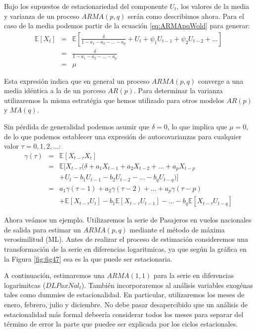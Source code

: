 \documentclass[
]{book}
\begin{document}
Bajo los supuestos de estacionariedad del componente \(U_t\), los valores de la media y varianza de un proceso \(ARMA(p, q)\) serán como describimos ahora. Para el caso de la media podemos partir de la ecuación \eqref{eq:ARMApqWold} para generar:
\begin{eqnarray}
    \mathbb{E}[X_t] & = & \mathbb{E}\left[ \frac{\delta}{1 - a_1 - a_2 - \ldots - a_p} + U_t + \psi_1 U_{t-1} + \psi_2 U_{t-2} + \ldots \right] \nonumber \\
    & = & \frac{\delta}{1 - a_1 - a_2 - \ldots - a_p} \nonumber \\
    & = & \mu
\end{eqnarray}

Esta expresión indica que en general un proceso \(ARMA(p, q)\) converge a una media idéntica a la de un porceso \(AR(p)\). Para determinar la varianza utilizaremos la misma estratégia que hemos utilizado para otros modelos \(AR(p)\) y \(MA(q)\).

Sin pérdida de generalidad podemos asumir que \(\delta = 0\), lo que implica que \(\mu = 0\), de lo que podemos establecer una expresión de autocovarianzas para cualquier valor \(\tau = 0, 1, 2, \ldots\):
\begin{eqnarray}
    \gamma(\tau) & = & \mathbb{E}[X_{t-\tau} X_t] \nonumber \\
    & = & \mathbb{E}[X_{t-\tau} (\delta + a_1 X_{t - 1} + a_2 X_{t - 2} + \ldots + a_p X_{t - p} \nonumber \\
    &   & + U_t - b_1 U_{t - 1} - b_2  U_{t - 2} - \ldots - b_q  U_{t - q})] \nonumber \\
    & = & a_1 \gamma(\tau - 1) + a_2 \gamma(\tau - 2) + \ldots + a_p \gamma(\tau - p) \nonumber \\
    &   & + \mathbb{E}[X_{t-\tau} U_{t}] - b_1  \mathbb{E}[X_{t-\tau} U_{t-1}] - \ldots  - b_q  \mathbb{E}[X_{t-\tau} U_{t-q}] 
\end{eqnarray}

Ahora veámos un ejemplo. Utilizaremos la serie de Pasajeros en vuelos nacionales de salida para estimar un \(ARMA(p, q)\) mediante el método de máxima verosimilitud (ML). Antes de realizar el proceso de estimación consideremos una transformación de la serie en diferencias logaritmicas, ya que según la gráfica en la Figura \ref{fig:fig47} esa es la que puede ser estacionaria.

A continuación, estimaremos una \(ARMA(1, 1)\) para la serie en diferencias logarimitcas (\(DLPaxNal_t\)). También incorporaremos al análisis variables exogénas tales como dummies de estacionalidad. En particular, utilizaremos los meses de enero, febrero, julio y diciembre. No debe pasar desapercibido que un análisis de estacionalidad más formal debeería considerar todos los meses para separar del término de error la parte que puedee ser explicada por los ciclos estacionales.
\end{document}
